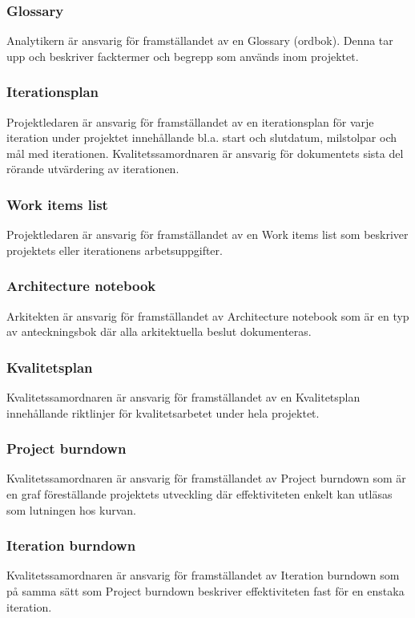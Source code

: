 \subsubsection{Glossary}
Analytikern är ansvarig för framställandet av en Glossary (ordbok). Denna tar upp och beskriver facktermer och begrepp som används inom projektet.

\subsubsection{Iterationsplan}
Projektledaren är ansvarig för framställandet av en iterationsplan för varje iteration under projektet innehållande bl.a. start och slutdatum, milstolpar och mål med iterationen. Kvalitetssamordnaren är ansvarig för dokumentets sista del rörande utvärdering av iterationen.

\subsubsection{Work items list}
Projektledaren är ansvarig för framställandet av en Work items list som beskriver projektets eller iterationens arbetsuppgifter.

\subsubsection{Architecture notebook}
Arkitekten är ansvarig för framställandet av Architecture notebook som är en typ av anteckningsbok där alla arkitektuella beslut dokumenteras.

\subsubsection{Kvalitetsplan}
Kvalitetssamordnaren är ansvarig för framställandet av en Kvalitetsplan innehållande riktlinjer för kvalitetsarbetet under hela projektet.

\subsubsection{Project burndown}
Kvalitetssamordnaren är ansvarig för framställandet av Project burndown som är en graf föreställande projektets utveckling där effektiviteten enkelt kan utläsas som lutningen hos kurvan.

\subsubsection{Iteration burndown}
Kvalitetssamordnaren är ansvarig för framställandet av Iteration burndown som på samma sätt som Project burndown beskriver effektiviteten fast för en enstaka iteration.

